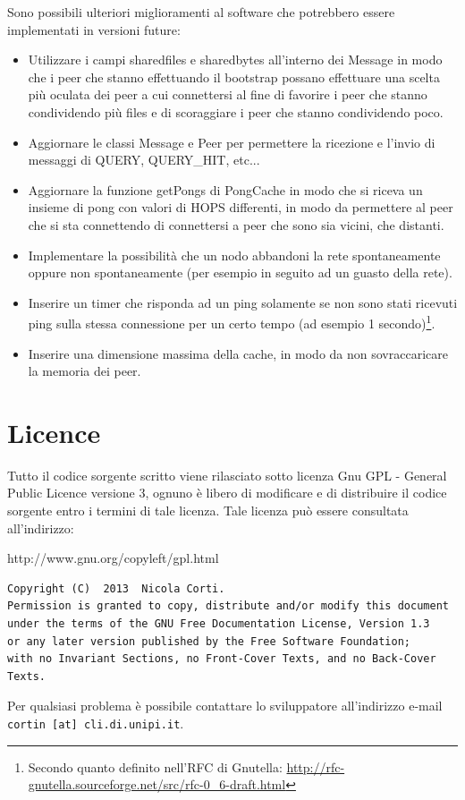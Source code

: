 \documentclass[a4paper,11pt]{article}
\begin{document}
Sono possibili ulteriori miglioramenti al software che potrebbero essere implementati in versioni future:

\begin{itemize}
\item Utilizzare i campi \textsf{sharedfiles} e \textsf{sharedbytes} all'interno dei \textsf{Message} in modo che i peer che stanno effettuando il bootstrap possano effettuare una scelta pi\`u oculata dei peer a cui connettersi al fine di favorire i peer che stanno condividendo pi\`u files e di scoraggiare i peer che stanno condividendo poco.

\item Aggiornare le classi \textsf{Message} e \textsf{Peer} per permettere la ricezione e l'invio di messaggi di \textsf{QUERY}, \textsf{QUERY\_HIT}, etc...

\item Aggiornare la funzione \textsf{getPongs} di \textsf{PongCache} in modo che si riceva un insieme di pong con valori di HOPS differenti, in modo da permettere al peer che si sta connettendo di connettersi a peer che sono sia vicini, che distanti.

\item Implementare la possibilit\`a che un nodo abbandoni la rete spontaneamente oppure non spontaneamente (per esempio in seguito ad un guasto della rete).

\item Inserire un timer che risponda ad un ping solamente se non sono stati ricevuti ping sulla stessa connessione per un certo tempo (ad esempio 1 secondo)\footnote{Secondo quanto definito nell'RFC di Gnutella: \url{http://rfc-gnutella.sourceforge.net/src/rfc-0_6-draft.html}}.

\item Inserire una dimensione massima della cache, in modo da non sovraccaricare la memoria dei peer.
\end{itemize}


\section{Licence}

\small{Tutto il codice sorgente scritto viene rilasciato sotto licenza Gnu GPL - General Public Licence versione 3, ognuno \`e libero di modificare e di distribuire il codice sorgente entro i termini di tale licenza.
Tale licenza pu\`o essere consultata all'indirizzo:

http://www.gnu.org/copyleft/gpl.html

\begin{verbatim}
Copyright (C)  2013  Nicola Corti.
Permission is granted to copy, distribute and/or modify this document
under the terms of the GNU Free Documentation License, Version 1.3
or any later version published by the Free Software Foundation;
with no Invariant Sections, no Front-Cover Texts, and no Back-Cover Texts.
\end{verbatim}
Per qualsiasi problema \`e possibile contattare lo sviluppatore all'indirizzo e-mail \texttt{cortin [at] cli.di.unipi.it}.
}
\end{document}
